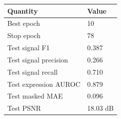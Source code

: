\begin{tabular}{ll}
\toprule
Quantity & Value \\
\midrule
Best epoch & 10 \\
Stop epoch & 78 \\
Test signal F1 & 0.387 \\
Test signal precision & 0.266 \\
Test signal recall & 0.710 \\
Test expression AUROC & 0.879 \\
Test masked MAE & 0.096 \\
Test PSNR & 18.03 dB \\
\bottomrule
\end{tabular}
